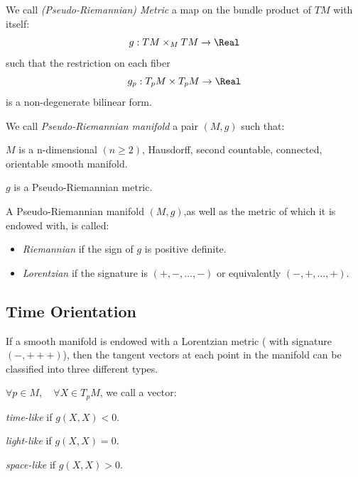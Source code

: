 \documentclass[Main]{subfiles}
\begin{document}
			\begin{definition}
				We call \emph{(Pseudo-Riemannian) Metric} a map on the bundle product of $TM$ with itself:
				$$g: TM \times_M TM \rightarrow \Real$$
				such that the restriction on each fiber $$g_p: T_pM \times T_pM \rightarrow \Real $$ is a non-degenerate bilinear form.
			\end{definition}

			\begin{definition}
				We call \emph{Pseudo-Riemannian manifold} a pair $(M, g)$ such that:
				\begin{compactitemize}
					\item $M$ is a n-dimensional $(n\geq2)$, Hausdorff, second countable, connected, orientable smooth manifold.
					\item $g$ is a Pseudo-Riemannian metric.
				\end{compactitemize}
			\end{definition}
			A Pseudo-Riemannian manifold $(M,g)$,as well as the metric of which it is endowed with, is called:
				 \begin{itemize}
				 	\item \emph{Riemannian} if the sign of $g$ is positive definite.%
				 	\item \emph{Lorentzian} if the signature is $(+, -, \ldots,- )$ or equivalently $(-,+,\ldots,+)$.
				 \end{itemize}

		\subsection{Time Orientation}
			If a smooth manifold is endowed with a Lorentzian metric ( with signature $(-,+++)$), then the tangent vectors at each point in the manifold can be classified into three different types.
			\begin{notationfix}

				$\forall p \in M, \quad \forall X \in T_pM$,  we call a vector:
				\begin{compactitemize}
					\item \emph{time-like} if $g(X,X)<0$.
					\item \emph{light-like} if $g(X,X)=0$.
					\item \emph{space-like} if $g(X,X)>0$.
				\end{compactitemize}
			\end{notationfix}
\end{document}
